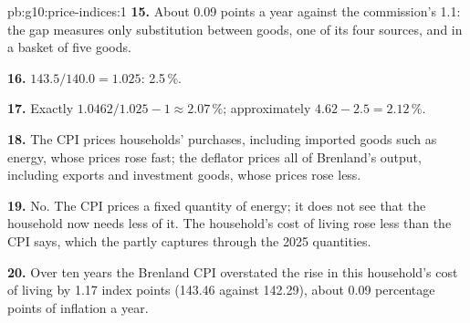 \begin{solution}{pb:g10:price-indices:1}
\textbf{15.} About 0.09 points a year against the commission's 1.1: the gap measures only substitution between goods, one of its four sources, and in a basket of five goods.

\textbf{16.} $143.5/140.0 = 1.025$: 2.5\,\%.

\textbf{17.} Exactly $1.0462/1.025 - 1 \approx 2.07\,\%$; approximately $4.62 - 2.5 = 2.12\,\%$.

\textbf{18.} The CPI prices households' purchases, including imported goods such as energy, whose prices rose fast; the deflator prices all of Brenland's output, including exports
and investment goods, whose prices rose less.

\textbf{19.} No. The CPI prices a fixed quantity of energy; it does not see that the household now needs less of it. The household's cost of living rose less than the CPI says, which
the  partly captures through the 2025 quantities.

\textbf{20.} Over ten years the Brenland CPI overstated the rise in this household's cost of living by 1.17 index points (143.46 against 142.29), about 0.09 percentage points of
inflation a year.
\end{solution}
